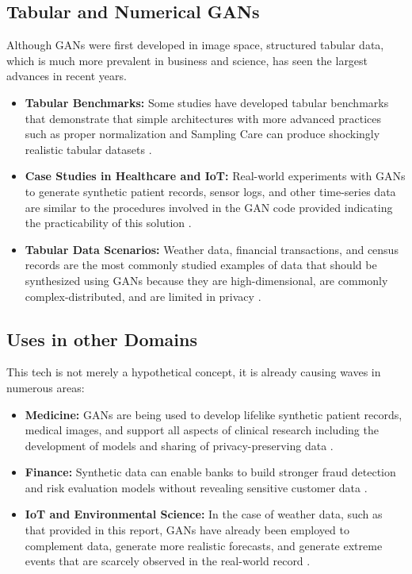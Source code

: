 \documentclass[12pt, draftclsnofoot, onecolumn]{IEEEtran}
\begin{document}
\subsection{Tabular and Numerical GANs}
Although GANs were first developed in image space, structured tabular data, which is much more prevalent in business and science, has seen the largest advances in recent years.
\begin{itemize}
    \item \textbf{Tabular Benchmarks:} Some studies have developed tabular benchmarks that demonstrate that simple architectures with more advanced practices such as proper normalization and Sampling Care can produce shockingly realistic tabular datasets \cite{ref6,ref24,ref23}.
    
    \item \textbf{Case Studies in Healthcare and IoT: } Real-world experiments with GANs to generate synthetic patient records, sensor logs, and other time-series data are similar to the procedures involved in the GAN code provided indicating the practicability of this solution \cite{ref7,ref8,ref19}.
    \item \textbf{Tabular Data Scenarios:} Weather data, financial transactions, and census records are the most commonly studied examples of data that should be synthesized using GANs because they are high-dimensional, are commonly complex-distributed, and are limited in privacy \cite{ref10,ref12,ref11}.
\end{itemize}

\subsection{Uses in other Domains}
This tech is not merely a hypothetical concept, it is already causing waves in numerous areas:
\begin{itemize}
    \item \textbf{Medicine:} GANs are being used to develop lifelike synthetic patient records, medical images, and support all aspects of clinical research including the development of models and sharing of privacy-preserving data \cite{ref2,ref8,ref10}.
    \item \textbf{Finance:} Synthetic data can enable banks to build stronger fraud detection and risk evaluation models without revealing sensitive customer data \cite{ref3,ref12}.
    \item \textbf{IoT and Environmental Science:} In the case of weather data, such as that provided in this report, GANs have already been employed to complement data, generate more realistic forecasts, and generate extreme events that are scarcely observed in the real-world record \cite{ref11,ref19,ref9}.
\end{itemize}
\end{document}
